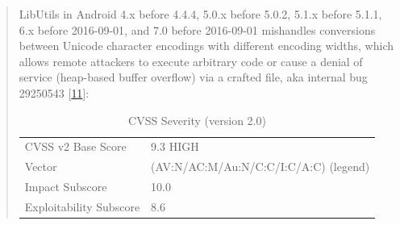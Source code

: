 \begin{quote}
LibUtils in Android 4.x before 4.4.4, 5.0.x before 5.0.2, 5.1.x before
5.1.1, 6.x before 2016-09-01, and 7.0 before 2016-09-01 mishandles
conversions between Unicode character encodings with different encoding
widths, which allows remote attackers to execute arbitrary code or cause
a denial of service (heap-based buffer overflow) via a crafted file, aka
internal bug 29250543 {[}\protect\hyperlink{nist2016}{11}{]}:

\begin{longtable}[]{@{}ll@{}}
\caption{CVSS Severity (version 2.0)}\tabularnewline
\toprule
\begin{minipage}[t]{0.31\columnwidth}\raggedright\strut
CVSS v2 Base Score\strut
\end{minipage} & \begin{minipage}[t]{0.63\columnwidth}\raggedright\strut
9.3 HIGH\strut
\end{minipage}\tabularnewline
\begin{minipage}[t]{0.31\columnwidth}\raggedright\strut
Vector\strut
\end{minipage} & \begin{minipage}[t]{0.63\columnwidth}\raggedright\strut
(AV:N/AC:M/Au:N/C:C/I:C/A:C) (legend)\strut
\end{minipage}\tabularnewline
\begin{minipage}[t]{0.31\columnwidth}\raggedright\strut
Impact Subscore\strut
\end{minipage} & \begin{minipage}[t]{0.63\columnwidth}\raggedright\strut
10.0\strut
\end{minipage}\tabularnewline
\begin{minipage}[t]{0.31\columnwidth}\raggedright\strut
Exploitability Subscore\strut
\end{minipage} & \begin{minipage}[t]{0.63\columnwidth}\raggedright\strut
8.6\strut
\end{minipage}\tabularnewline
\bottomrule
\end{longtable}


\end{quote}
